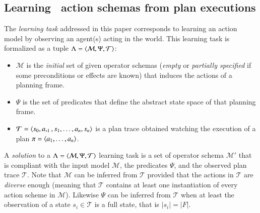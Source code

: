 \subsection{Learning \strips\ action schemas from plan executions}
The {\em learning task} addressed in this paper corresponds to learning an action model by observing an agent(s) acting in the world. This learning task is formalized as a tuple $\Lambda={\langle \mathcal{M},\Psi,\mathcal{T} \rangle}$:
\begin{itemize}
\item $\mathcal{M}$ is the {\em initial} set of given operator schemas ({\em empty} or {\em partially specified} if some preconditions or effects are known) that induces the actions of a planning frame.
\item $\Psi$ is the set of predicates that define the abstract state space of that planning frame. 
\item $\mathcal{T}={\langle s_0,a,_1,s_1,\ldots,a_n,s_{n} \rangle}$ is a plan trace obtained watching the execution of a plan $\pi={\langle a_1, \ldots, a_n \rangle}$. 
\end{itemize}

A {\em solution} to a $\Lambda={\langle \mathcal{M},\Psi,\mathcal{T} \rangle}$ learning task is a set of operator schema $\mathcal{M}'$ that is compliant with the input model $\mathcal{M}$, the predicates $\Psi$, and the observed plan trace $\mathcal{T}$. Note that $\mathcal{M}$ can be inferred from $\mathcal{T}$ provided that the actions in $\mathcal{T}$ are {\em diverse} enough (meaning that $\mathcal{T}$ contains at least one instantiation of every action scheme in $\mathcal{M}$). Likewise $\Psi$ can be inferred from $\mathcal{T}$ when at least the observation of a state $s_i\in \mathcal{T}$ is a full state, that is $|s_i|=|F|$.

